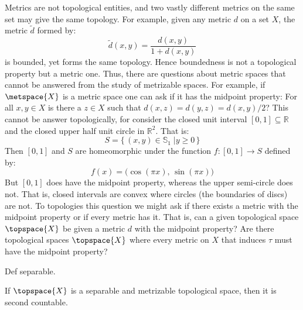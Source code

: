 \documentclass{book}                                                           %
\begin{document}
            \begin{example}
                Metrics are not topological entities, and two vastly different
                metrics on the same set may give the same topology. For example,
                given any metric $d$ on a set $X$, the metric $\tilde{d}$ formed by:
                \begin{equation}
                    \tilde{d}(x,y)=\frac{d(x,y)}{1+d(x,y)}
                \end{equation}
                is bounded, yet forms the same topology. Hence boundedness is not a
                topological property but a metric one. Thus, there are questions
                about metric spaces that cannot be answered from the study of
                metrizable spaces. For example, if $\metspace{X}$ is a metric space
                one can ask if it has the midpoint property: For all $x,y\in{X}$
                is there a $z\in{X}$ such that $d(x,z)=d(y,z)=d(x,y)/2$? This cannot
                be answer topologically, for consider the closed unit interval
                $[0,1]\subseteq\mathbb{R}$ and the closed upper half unit circle in
                $\mathbb{R}^{2}$. That is:
                \begin{equation}
                    S=\{\,(x,y)\in\mathbb{S}_{1}\;|y\geq{0}\,\}
                \end{equation}
                Then $[0,1]$ and $S$ are homeomorphic under the function
                $f:[0,1]\rightarrow{S}$ defined by:
                \begin{equation}
                    f(x)=\big(\cos(\pi{x}),\,\sin(\pi{x})\big)
                \end{equation}
                But $[0,1]$ does have the midpoint property, whereas the upper
                semi-circle does not. That is, closed intervals are convex where
                circles (the boundaries of discs) are not. To topologies this
                question we might ask if there exists a metric with the midpoint
                property or if every metric has it. That is, can a given topological
                space $\topspace{X}$ be given a metric $d$ with the midpoint
                property? Are there topological spaces $\topspace{X}$ where every
                metric on $X$ that induces $\tau$ must have the midpoint property?
            \end{example}
            Def separable.
            \begin{theorem}
                If $\topspace{X}$ is a separable and metrizable topological space,
                then it is second countable.
            \end{theorem}
\end{document}
